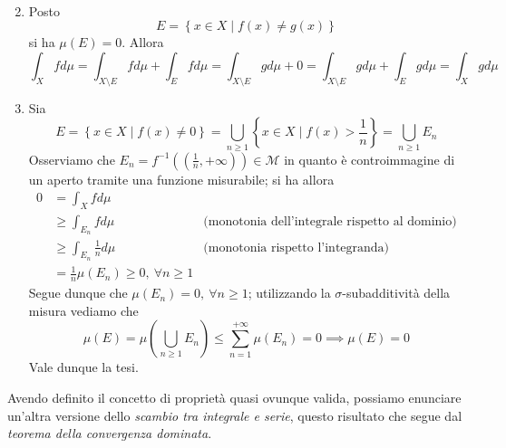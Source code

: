 \begin{demonstration}~{}
	\begin{enumerate}[label=\Roman*]
		\setcounter{enumi}{1}
		\item Posto
		\begin{equation*}
			E=\left\{x\in X\mid f(x)\neq g(x)\right\}
		\end{equation*}
	si ha $\mu\left(E\right)=0$. Allora
	\begin{equation*}
		\int_Xfd\mu=\int_{X\setminus E}fd\mu+\int_Efd\mu=\int_{X\setminus E}gd\mu+0=\int_{X\setminus E}gd\mu+\int_Egd\mu=\int_Xgd\mu
	\end{equation*}
	\item Sia
		\begin{equation*}
			E=\left\{x\in X\mid f(x)\neq 0\right\}=\bigcup_{n\geq 1}\left\{x\in X\mid f(x)>\frac{1}{n}\right\}=\bigcup_{n\geq 1}E_n
		\end{equation*}
	Osserviamo che $E_n=f^{-1}\left(\left(\frac{1}{n},+\infty\right)\right)\in\mathcal{M}$ in quanto è controimmagine di un aperto tramite una funzione misurabile; si ha allora
	\begin{align*}
		0&=\int_Xfd\mu&\\
		 &\geq\int_{E_n}fd\mu&\text{(monotonia dell'integrale rispetto al dominio)}\\
		 &\geq\int_{E_n}\frac{1}{n}d\mu&\text{(monotonia rispetto l'integranda)}\\
		 &=\frac{1}{n}\mu\left(E_n\right)\geq 0,\ \forall n\geq 1&
	\end{align*}
	Segue dunque che $\mu\left(E_n\right)=0,\ \forall n\geq 1$; utilizzando la $\sigma$-subadditività della misura vediamo che
	\begin{equation*}
		\mu\left(E\right)=\mu\left(\bigcup_{n\geq 1}E_n\right)\leq\sum_{n=1}^{+\infty}\mu\left(E_n\right)=0\implies \mu\left(E\right)=0
	\end{equation*}
	Vale dunque la tesi.\qedhere
	\end{enumerate}
\end{demonstration}
Avendo definito il concetto di proprietà quasi ovunque valida, possiamo enunciare un'altra versione dello \textit{scambio tra integrale e serie}, questo risultato che segue dal \textit{teorema della convergenza dominata}.
